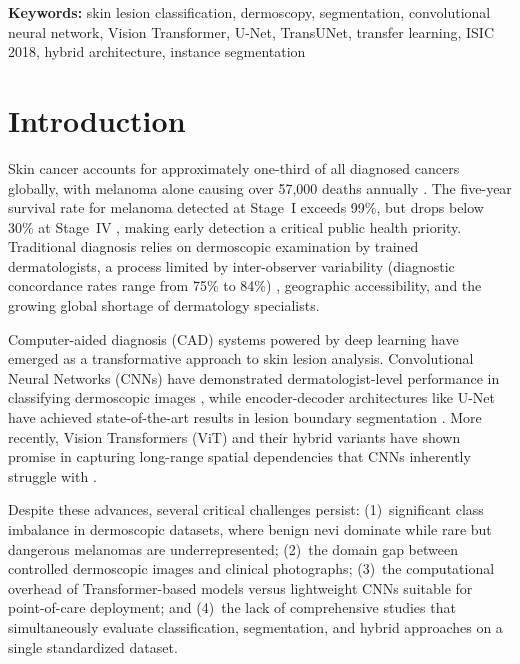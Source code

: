 \documentclass[10pt,twocolumn]{article}
\begin{document}
\smallskip
\noindent\textbf{Keywords:} skin lesion classification, dermoscopy, segmentation, convolutional neural network, Vision Transformer, U-Net, TransUNet, transfer learning, ISIC 2018, hybrid architecture, instance segmentation

\section{Introduction}

Skin cancer accounts for approximately one-third of all diagnosed cancers globally, with melanoma alone causing over 57,000 deaths annually \cite{WHO2024}. The five-year survival rate for melanoma detected at Stage~I exceeds 99\%, but drops below 30\% at Stage~IV \cite{ACS2024}, making early detection a critical public health priority. Traditional diagnosis relies on dermoscopic examination by trained dermatologists, a process limited by inter-observer variability (diagnostic concordance rates range from 75\% to 84\%) \cite{Brinker2019}, geographic accessibility, and the growing global shortage of dermatology specialists.

Computer-aided diagnosis (CAD) systems powered by deep learning have emerged as a transformative approach to skin lesion analysis. Convolutional Neural Networks (CNNs) have demonstrated dermatologist-level performance in classifying dermoscopic images \cite{Esteva2017, Haenssle2018}, while encoder-decoder architectures like U-Net have achieved state-of-the-art results in lesion boundary segmentation \cite{Ronneberger2015}. More recently, Vision Transformers (ViT) and their hybrid variants have shown promise in capturing long-range spatial dependencies that CNNs inherently struggle with \cite{Dosovitskiy2021, ChenTransUNet2021}.

Despite these advances, several critical challenges persist: (1)~significant class imbalance in dermoscopic datasets, where benign nevi dominate while rare but dangerous melanomas are underrepresented; (2)~the domain gap between controlled dermoscopic images and clinical photographs; (3)~the computational overhead of Transformer-based models versus lightweight CNNs suitable for point-of-care deployment; and (4)~the lack of comprehensive studies that simultaneously evaluate classification, segmentation, and hybrid approaches on a single standardized dataset.
\end{document}
